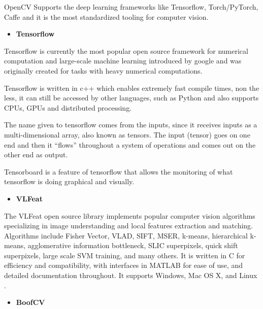     OpenCV Supports the deep learning frameworks like Tensorflow, Torch/PyTorch, Caffe and it is the most standardized tooling for computer vision.  

   \begin{itemize}
       \item \textbf{Tensorflow}
   \end{itemize} 

    \label{Tensorflow}
   

    Tensorflow is currently the most popular open source framework for numerical computation and large-scale machine learning introduced by google and was originally created for tasks with heavy numerical computations.  \cite{Abadi} \cite{Dignam1983} 
    
    Tensorflow is written in c++ which enables extremely fast compile times, non the less, it can still be accessed by other languages, such as Python and also supports CPUs, GPUs and distributed processing. \par
    

    The name given to tensorflow comes from the inputs, since it receives inputs as a multi-dimensional array, also known as tensors. The input (tensor) goes on one end and then it “flows” throughout a system of operations and comes out on the other end as output. \par 
    
    Tensorboard is a feature of tensorflow that allows the monitoring of what tensorflow is doing graphical and visually.\par

    \begin{itemize}
        \item \textbf{VLFeat}
    \end{itemize}

    The VLFeat open source library implements popular computer vision algorithms specializing in image understanding and local features extraction and matching. Algorithms include Fisher Vector, VLAD, SIFT, MSER, k-means, hierarchical k-means, agglomerative information bottleneck, SLIC superpixels, quick shift superpixels, large scale SVM training, and many others. It is written in C for efficiency and compatibility, with interfaces in MATLAB for ease of use, and detailed documentation throughout. It supports Windows, Mac OS X, and Linux \cite{vedaldi08vlfeat}.

    \begin{itemize}
        \item \textbf{BoofCV}
    \end{itemize}

